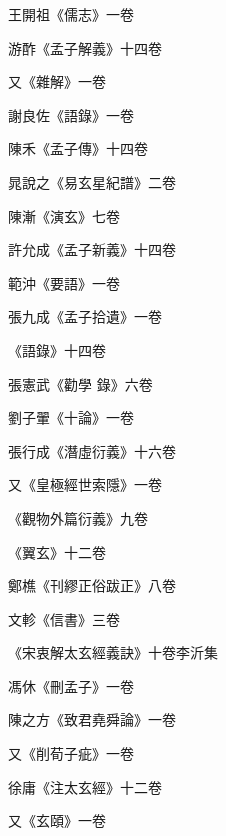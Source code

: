 \begin{pinyinscope}
 王開祖《儒志》一卷



 游酢《孟子解義》十四卷



 又《雜解》一卷



 謝良佐《語錄》一卷



 陳禾《孟子傳》十四卷



 晁說之《易玄星紀譜》二卷



 陳漸《演玄》七卷



 許允成《孟子新義》十四卷



 範沖《要語》一卷



 張九成《孟子拾遺》一卷



 《語錄》十四卷



 張憲武《勸學
 錄》六卷



 劉子翬《十論》一卷



 張行成《潛虛衍義》十六卷



 又《皇極經世索隱》一卷



 《觀物外篇衍義》九卷



 《翼玄》十二卷



 鄭樵《刊繆正俗跋正》八卷



 文軫《信書》三卷



 《宋衷解太玄經義訣》十卷李沂集



 馮休《刪孟子》一卷



 陳之方《致君堯舜論》一卷



 又《削荀子疵》一卷



 徐庸《注太玄經》十二卷



 又《玄頤》一卷




\end{pinyinscope}
